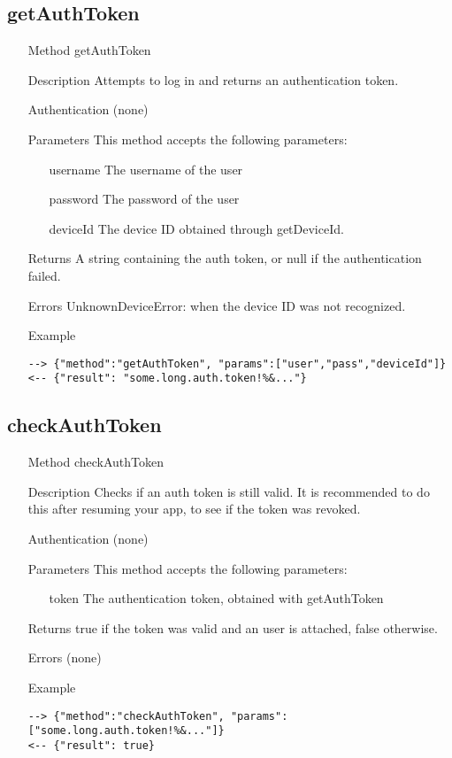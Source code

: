 \documentclass[a4paper]{scrreprt}
\begin{document}
\subsection{getAuthToken}\label{m:getAuthToken}
\begin{enumerate}
\item[Method] getAuthToken
\item[Description] Attempts to log in and returns an authentication token.
\item[Authentication] (none)
\item[Parameters] This method accepts the following parameters:
\begin{enumerate}
    \item[username] The username of the user
    \item[password] The password of the user
    \item[deviceId] The device ID obtained through getDeviceId.
    \end{enumerate}
\item[Returns] A string containing the auth token, or null if the authentication failed.
\item[Errors] UnknownDeviceError: when the device ID was not recognized.
\item[Example]
\begin{lstlisting}
--> {"method":"getAuthToken", "params":["user","pass","deviceId"]}
<-- {"result": "some.long.auth.token!%&..."}
\end{lstlisting}
\end{enumerate}

\clearpage
\subsection{checkAuthToken}
\begin{enumerate}
\item[Method] checkAuthToken
\item[Description] Checks if an auth token is still valid. It is recommended to do this after resuming your app, to see if the token was revoked.
\item[Authentication] (none)
\item[Parameters] This method accepts the following parameters:
\begin{enumerate}
    \item[token] The authentication token, obtained with getAuthToken
    \end{enumerate}
\item[Returns] true if the token was valid and an user is attached, false otherwise.
\item[Errors] (none)
\item[Example]
\begin{lstlisting}
--> {"method":"checkAuthToken", "params":["some.long.auth.token!%&..."]}
<-- {"result": true}
\end{lstlisting}
\end{enumerate}
\end{document}

